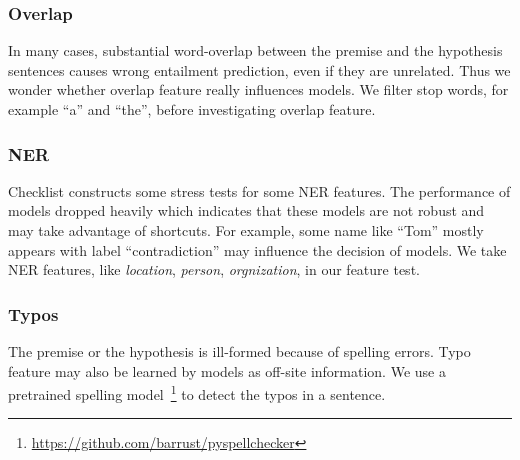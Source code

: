 \subsubsection{Overlap}
In many cases, substantial word-overlap between the premise and the
hypothesis sentences causes wrong entailment prediction, 
even if they are unrelated. 
Thus we wonder 
whether overlap feature really influences models. 
We filter stop words, for example ``a'' and ``the'', before investigating overlap feature. 


\subsubsection{NER}
Checklist constructs some stress tests for some NER features. The performance 
of models dropped heavily which indicates that these models are not robust and may 
take advantage of shortcuts.
For example, some name like ``Tom'' mostly appears with label ``contradiction'' 
may influence the decision of models.
We take NER features, like \textit{location}, \textit{person}, \textit{orgnization}, in our feature test.

\subsubsection{Typos}
The premise or the hypothesis is ill-formed because of spelling errors. 
Typo feature may also be learned by models as off-site information. 
We use a pretrained spelling model~\footnote{\url{https://github.com/barrust/pyspellchecker}} 
to detect the typos in a sentence. 



